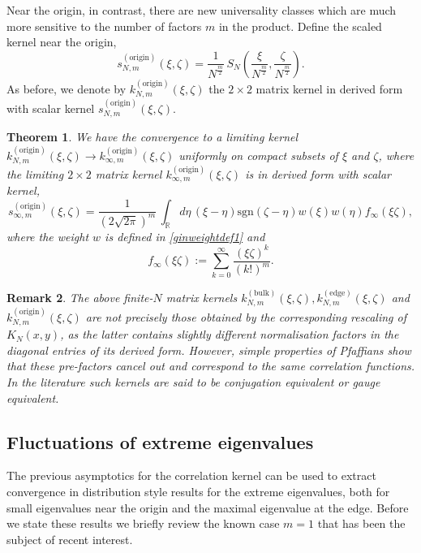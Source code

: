\documentclass[11pt,reqno]{amsproc}
\newtheorem{theorem}{Theorem}
\newtheorem{remark}[theorem]{Remark}
\numberwithin{equation}{section}
\numberwithin{theorem}{section}
\begin{document}
Near the origin, in contrast, there are new universality classes which are much more sensitive to the number of factors $m$ in the product. Define the scaled kernel near the origin,
\begin{equation}
s^{(\mathrm{origin})}_{N,m}(\xi,\zeta) = \frac{1}{N^{\frac{m}{2}}}\,S_{N}\left(\frac{\xi}{N^{\frac{m}{2}}},\frac{\zeta}{N^{\frac{m}{2}}}\right).
\end{equation}
As before, we denote by $k^{(\mathrm{origin})}_{N,m}(\xi,\zeta)$ the $2 \times 2$ matrix kernel in derived form with scalar kernel $s^{(\mathrm{origin})}_{N,m}(\xi,\zeta)$.
\begin{theorem}
\label{th:origkern}
We have the convergence to a limiting kernel $k^{(\mathrm{origin})}_{N,m}(\xi,\zeta) \to k^{(\mathrm{origin})}_{\infty,m}(\xi,\zeta)$ uniformly on compact subsets of $\xi$ and $\zeta$, where the limiting $2 \times 2$ matrix kernel $k^{(\mathrm{origin})}_{\infty,m}(\xi,\zeta)$ is in derived form with scalar kernel,
\begin{equation}
s^{(\mathrm{origin})}_{\infty,m}(\xi,\zeta) = \frac{1}{(2\sqrt{2\pi})^{m}}\,\int_{\mathbb{R}}d\eta\,(\xi-\eta)\mathrm{sgn}(\zeta-\eta)w(\xi)w(\eta)f_{\infty}(\xi\zeta),
\end{equation}
where the weight $w$ is defined in \eqref{ginweightdef1} and
\begin{equation}
f_{\infty}(\xi\zeta) := \sum_{k=0}^{\infty}\frac{(\xi\zeta)^{k}}{(k!)^{m}}.
\end{equation}
\end{theorem}
\begin{remark}
The above finite-$N$ matrix kernels $k^{(\mathrm{bulk})}_{N,m}(\xi,\zeta), k^{(\mathrm{edge})}_{N,m}(\xi,\zeta)$ and $k^{(\mathrm{origin})}_{N,m}(\xi,\zeta)$ are not precisely those obtained by the corresponding rescaling of $K_{N}(x,y)$, as the latter contains slightly different normalisation factors in the diagonal entries of its derived form. However, simple properties of Pfaffians show that these pre-factors cancel out and correspond to the same correlation functions. In the literature such kernels are said to be conjugation equivalent or gauge equivalent.
\end{remark} 
\subsection{Fluctuations of extreme eigenvalues}
\label{se:fluctext}
The previous asymptotics for the correlation kernel can be used to extract convergence in distribution style results for the extreme eigenvalues, both for small eigenvalues near the origin and the maximal eigenvalue at the edge. Before we state these results we briefly review the known case $m=1$ that has been the subject of recent interest. 
\end{document}
